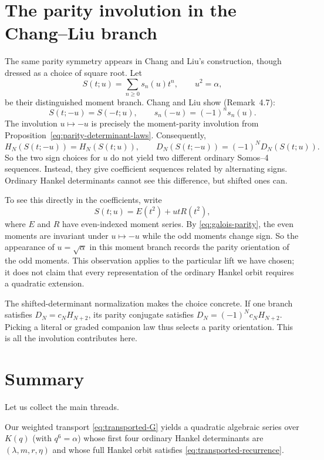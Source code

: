 \documentclass[11pt]{article}
\theoremstyle{definition}
\theoremstyle{remark}
\begin{document}
\section{The parity involution in the Chang--Liu branch}
The same parity symmetry appears in Chang and Liu's construction, though dressed
as a choice of square root. Let
\[
 S(t;u)=\sum_{n\geq0}s_n(u)t^n,\qquad u^2=\alpha,
\]
be their distinguished moment branch. Chang and Liu show (Remark~4.7):
\begin{equation}
 S(t;-u)=S(-t;u),\qquad s_n(-u)=(-1)^ns_n(u).
 \label{eq:galois-parity}
\end{equation}
The involution $u\mapsto-u$ is precisely the moment-parity involution from
Proposition~\ref{eq:parity-determinant-laws}. Consequently,
\begin{equation}
 H_N(S(t;-u))=H_N(S(t;u)),\qquad
 D_N(S(t;-u))=(-1)^ND_N(S(t;u)).
 \label{eq:CL-parity-determinants}
\end{equation}
So the two sign choices for $u$ do not yield two different ordinary Somos--4
sequences. Instead, they give coefficient sequences related by alternating signs.
Ordinary Hankel determinants cannot see this difference, but shifted ones can.

To see this directly in the coefficients, write
\[
 S(t;u)=E(t^2)+utR(t^2),
\]
where $E$ and $R$ have even-indexed moment series. By \eqref{eq:galois-parity},
the even moments are invariant under $u\mapsto-u$ while the odd moments change
sign. So the appearance of $u=\sqrt\alpha$ in this moment branch records the
parity orientation of the odd moments. This observation applies to the
particular lift we have chosen; it does not claim that every representation of
the ordinary Hankel orbit requires a quadratic extension.

The shifted-determinant normalization makes the choice concrete. If one branch
satisfies $D_N=c_NH_{N+2}$, its parity conjugate satisfies
$D_N=(-1)^Nc_NH_{N+2}$. Picking a literal or graded companion law thus selects
a parity orientation. This is all the involution contributes here.

\section{Summary}
Let us collect the main threads.

Our weighted transport \eqref{eq:transported-G} yields a quadratic algebraic
series over $K(q)$ (with $q^6=\alpha$) whose first four ordinary Hankel
determinants are $(\lambda,m,r,\eta)$ and whose full Hankel orbit satisfies
\eqref{eq:transported-recurrence}.
\end{document}

